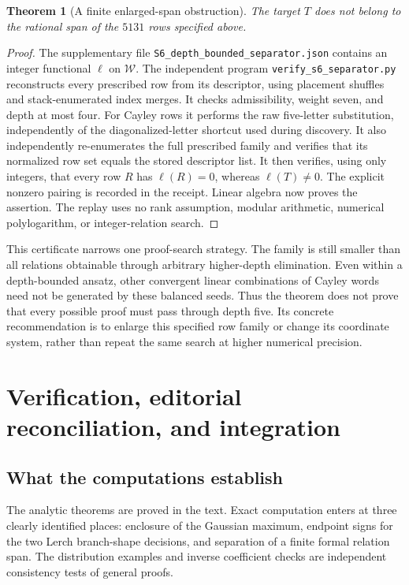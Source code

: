 \documentclass[11pt,a4paper]{article}
\numberwithin{equation}{section}
\newtheorem{theorem}{Theorem}[section]
\theoremstyle{definition}
\theoremstyle{remark}
\begin{document}
\begin{theorem}[A finite enlarged-span obstruction]
The target $T$ does not belong to the rational span of the $5131$
rows specified above.
\end{theorem}
\begin{proof}
The supplementary file \texttt{S6\_depth\_bounded\_separator.json}
contains an integer functional $\ell$ on $\mathcal W$. The independent
program \texttt{verify\_s6\_separator.py} reconstructs every prescribed
row from its descriptor, using placement shuffles and stack-enumerated
index merges. It checks admissibility, weight seven, and depth at most
four. For Cayley rows it performs the raw five-letter substitution,
independently of the diagonalized-letter shortcut used during discovery.
It also independently re-enumerates the full prescribed family and verifies
that its normalized row set equals the stored descriptor list. It then
verifies, using only integers, that every row $R$ has
$\ell(R)=0$, whereas $\ell(T)\ne0$. The explicit nonzero pairing is
recorded in the receipt. Linear algebra now proves the assertion.
The replay uses no rank assumption, modular arithmetic, numerical
polylogarithm, or integer-relation search.
\end{proof}

This certificate narrows one proof-search strategy. The family is still
smaller than all relations obtainable through arbitrary higher-depth
elimination. Even within a depth-bounded ansatz, other convergent linear
combinations of Cayley words need not be generated by these balanced
seeds. Thus the theorem does not prove that every possible proof must
pass through depth five. Its concrete recommendation is to enlarge
this specified row family or change its coordinate system, rather than
repeat the same search at higher numerical precision.


\section{Verification, editorial reconciliation, and integration}
\label{sec:audit}

\subsection{What the computations establish}

The analytic theorems are proved in the text. Exact computation enters
at three clearly identified places: enclosure of the Gaussian maximum,
endpoint signs for the two Lerch branch-shape decisions, and separation
of a finite formal relation span. The distribution examples and inverse
coefficient checks are independent consistency tests of general proofs.
\end{document}

